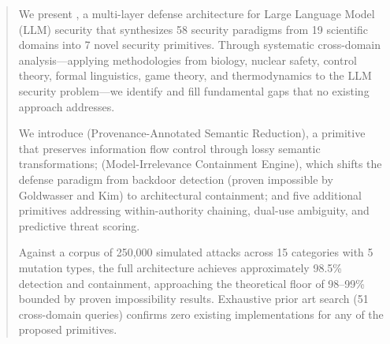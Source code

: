 \begin{abstract}
We present \sentinel, a multi-layer defense architecture for Large Language Model (LLM) security that synthesizes 58 security paradigms from 19 scientific domains into 7 novel security primitives. Through systematic cross-domain analysis---applying methodologies from biology, nuclear safety, control theory, formal linguistics, game theory, and thermodynamics to the LLM security problem---we identify and fill fundamental gaps that no existing approach addresses.

We introduce \pasr (Provenance-Annotated Semantic Reduction), a primitive that preserves information flow control through lossy semantic transformations; \mire (Model-Irrelevance Containment Engine), which shifts the defense paradigm from backdoor detection (proven impossible by Goldwasser and Kim) to architectural containment; and five additional primitives addressing within-authority chaining, dual-use ambiguity, and predictive threat scoring.

Against a corpus of 250,000 simulated attacks across 15 categories with 5 mutation types, the full architecture achieves approximately 98.5\% detection and containment, approaching the theoretical floor of 98--99\% bounded by proven impossibility results. Exhaustive prior art search (51 cross-domain queries) confirms zero existing implementations for any of the proposed primitives.
\end{abstract}
